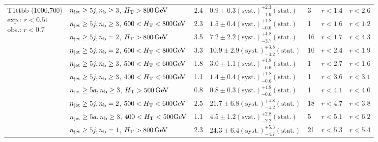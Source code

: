 \begin{table}[h!]
\begin{tabular}{ lllllll }
\multirow{10}{*}{\parbox[t]{2cm}{T1ttbb (1000,700)\\exp.: $r<0.51$\\obs.: $r<0.7$}}
 & $n_{\mathrm{jet}} \geq5j,n_{\text{b}} \geq3$, $\mbox{$H_\text{T}$} > 800 \, \mathrm{GeV}$ & 2.4 & $0.9 \pm 0.3 \mathrm{(syst.)} ^{+2.3}_{-1.9} \mathrm{(stat.)}$ & 3 & $r < 1.4$ & $r < 2.6$\\ 
 & $n_{\mathrm{jet}} \geq5j,n_{\text{b}} \geq3$, $600 < \mbox{$H_\text{T}$} < 800 \mathrm{GeV}$ & 2.3 & $1.5 \pm 0.4 \mathrm{(syst.)} ^{+1.8}_{-0.6} \mathrm{(stat.)}$ & 1 & $r < 1.6$ & $r < 1.2$\\ 
 & $n_{\mathrm{jet}} \geq5j,n_{\text{b}} =2$, $\mbox{$H_\text{T}$} > 800 \, \mathrm{GeV}$ & 3.5 & $7.2 \pm 2.2 \mathrm{(syst.)} ^{+4.8}_{-3.7} \mathrm{(stat.)}$ & 16 & $r < 1.7$ & $r < 4.3$\\ 
 & $n_{\mathrm{jet}} \geq5j,n_{\text{b}} =2$, $600 < \mbox{$H_\text{T}$} < 800 \mathrm{GeV}$ & 3.3 & $10.9 \pm 2.9 \mathrm{(syst.)} ^{+3.8}_{-3.2} \mathrm{(stat.)}$ & 10 & $r < 2.4$ & $r < 1.9$\\ 
 & $n_{\mathrm{jet}} \geq5j,n_{\text{b}} \geq3$, $500 < \mbox{$H_\text{T}$} < 600 \mathrm{GeV}$ & 1.8 & $3.0 \pm 1.1 \mathrm{(syst.)} ^{+1.8}_{-0.6} \mathrm{(stat.)}$ & 1 & $r < 2.7$ & $r < 1.6$\\ 
 & $n_{\mathrm{jet}} \geq5j,n_{\text{b}} \geq3$, $400 < \mbox{$H_\text{T}$} < 500 \mathrm{GeV}$ & 1.1 & $1.4 \pm 0.4 \mathrm{(syst.)} ^{+1.8}_{-0.6} \mathrm{(stat.)}$ & 1 & $r < 3.6$ & $r < 3.1$\\ 
 & $n_{\mathrm{jet}} \geq5a,n_{\text{b}} \geq3$, $\mbox{$H_\text{T}$} > 500 \, \mathrm{GeV}$ & 0.8 & $0.8 \pm 0.3 \mathrm{(syst.)} ^{+1.8}_{-0.6} \mathrm{(stat.)}$ & 1 & $r < 4.1$ & $r < 4.0$\\ 
 & $n_{\mathrm{jet}} \geq5j,n_{\text{b}} =2$, $500 < \mbox{$H_\text{T}$} < 600 \mathrm{GeV}$ & 2.5 & $21.7 \pm 6.8 \mathrm{(syst.)} ^{+4.8}_{-4.2} \mathrm{(stat.)}$ & 18 & $r < 4.7$ & $r < 3.8$\\ 
 & $n_{\mathrm{jet}} \geq5a,n_{\text{b}} \geq3$, $400 < \mbox{$H_\text{T}$} < 500 \mathrm{GeV}$ & 1.1 & $4.5 \pm 1.2 \mathrm{(syst.)} ^{+2.8}_{-2.2} \mathrm{(stat.)}$ & 5 & $r < 5.1$ & $r < 6.2$\\ 
 & $n_{\mathrm{jet}} \geq5j,n_{\text{b}} =1$, $\mbox{$H_\text{T}$} > 800 \, \mathrm{GeV}$ & 2.3 & $24.3 \pm 6.4 \mathrm{(syst.)} ^{+5.3}_{-4.7} \mathrm{(stat.)}$ & 21 & $r < 5.3$ & $r < 5.4$\\ \hline
    \hline
  \end{tabular}
\end{table}

